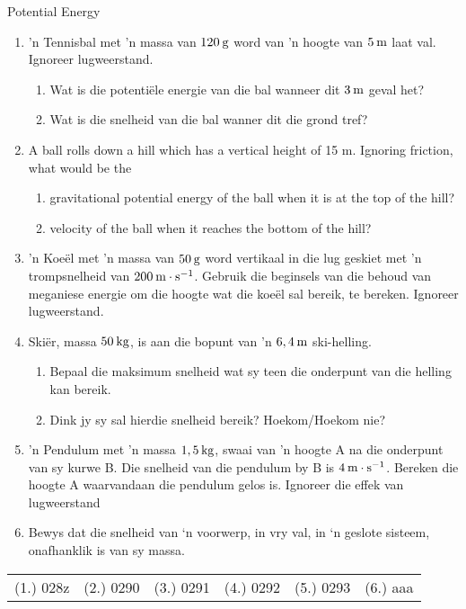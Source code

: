 \begin{exercises}{Potential Energy}
\begin{enumerate}[noitemsep, label=\textbf{\arabic*}. ] 
    \item 'n Tennisbal met 'n massa van $120\phantom{\rule{2pt}{0ex}}\text{g}$ word van 'n hoogte van $5\phantom{\rule{2pt}{0ex}}\text{m}$ laat val. Ignoreer lugweerstand.
    \begin{enumerate}[noitemsep, label=\textbf{\alph*}. ] 
    \item Wat is die potenti\"ele energie van die bal wanneer dit $3\phantom{\rule{2pt}{0ex}}\text{m}$ geval het?
    \item Wat is die snelheid van die bal wanner dit die grond tref?
    \end{enumerate}
\item A ball rolls down a hill which has a vertical height of 15 m. Ignoring friction, what would be the
\begin{enumerate}[noitemsep, label=\textbf{\alph*}. ] 
\item gravitational potential energy of the ball when it is at the top of the hill?
\item velocity of the ball when it reaches the bottom of the hill?
\end{enumerate}
    \item 'n Koe\"el met 'n massa van $50\phantom{\rule{2pt}{0ex}}\text{g}$ word vertikaal in die lug geskiet met 'n trompsnelheid van $200\phantom{\rule{2pt}{0ex}}\text{m}\ensuremath{\cdot}\text{s}{}^{-1}$. Gebruik die beginsels van die behoud van meganiese energie om die hoogte wat die koe\"el sal bereik, te bereken. Ignoreer lugweerstand.
    \item \n Ski\"er, massa $50\phantom{\rule{2pt}{0ex}}\text{kg}$, is aan die bopunt van 'n $6,4\phantom{\rule{2pt}{0ex}}\text{m}$ ski-helling.
    \begin{enumerate}[noitemsep, label=\textbf{\alph*}. ] 
    \item Bepaal die maksimum snelheid wat sy teen die onderpunt van die helling kan bereik.
    \item Dink jy sy sal hierdie snelheid bereik? Hoekom/Hoekom nie?
    \end{enumerate}
    \item 'n Pendulum met 'n massa $1,5\phantom{\rule{2pt}{0ex}}\text{kg}$, swaai van 'n hoogte A na die onderpunt van sy kurwe B. Die snelheid van die pendulum by B is $4\phantom{\rule{2pt}{0ex}}\text{m}\ensuremath{\cdot}\text{s}{}^{-1}$. Bereken die hoogte A waarvandaan die pendulum gelos is. Ignoreer die effek van lugweerstand \newline
    \item Bewys dat die snelheid van ‘n voorwerp, in vry val, in ‘n geslote sisteem, onafhanklik is van sy massa.\newline
\end{enumerate}

\practiceinfo
\par \begin{tabular}[h]{cccccc}
(1.) 028z  &  (2.) 0290  &  (3.) 0291  &  (4.) 0292  &  (5.) 0293  & (6.) aaa \end{tabular}
\end{exercises}
